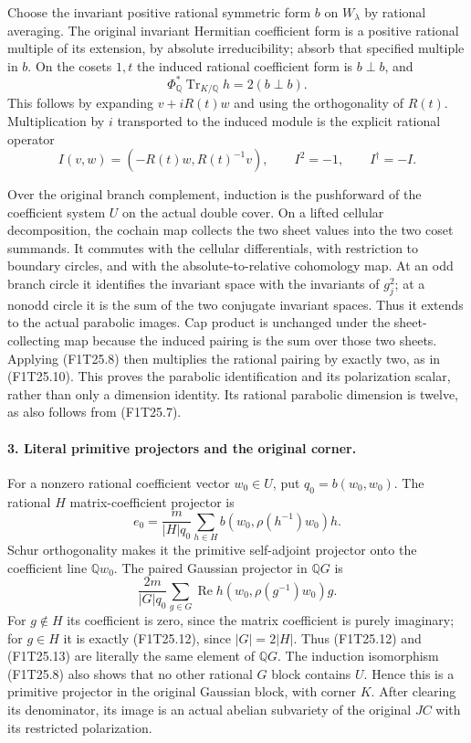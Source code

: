 Choose the invariant positive rational symmetric form $b$
on $W_\lambda$ by rational averaging. The original invariant
Hermitian coefficient form is a positive rational multiple
of its extension, by absolute irreducibility; absorb that
specified multiple in $b$. On the cosets $1,t$ the induced
rational coefficient form is $b\perp b$, and
\[
 \Phi_{\mathbb Q}^*\operatorname{Tr}_{K/\mathbb Q}h
                         =2(b\perp b).
 \tag{F1T25.10}
\]
This follows by expanding $v+iR(t)w$ and using the
orthogonality of $R(t)$. Multiplication by $i$ transported
to the induced module is the explicit rational operator
\[
                I(v,w)=(-R(t)w,R(t)^{-1}v),
          \qquad I^2=-1,\qquad I^\dagger=-I.
 \tag{F1T25.11}
\]

Over the original branch complement, induction is the
pushforward of the coefficient system $U$ on the actual
double cover. On a lifted cellular decomposition, the
cochain map collects the two sheet values into the two
coset summands. It commutes with the cellular differentials,
with restriction to boundary circles, and with the
absolute-to-relative cohomology map. At an odd branch
circle it identifies the invariant space with the
invariants of $g_j^2$; at a nonodd circle it is the sum
of the two conjugate invariant spaces. Thus it extends
to the actual parabolic images. Cap product is unchanged
under the sheet-collecting map because the induced pairing
is the sum over those two sheets. Applying (F1T25.8) then
multiplies the rational pairing by exactly two, as in
(F1T25.10). This proves the parabolic identification and
its polarization scalar, rather than only a dimension
identity. Its rational parabolic dimension is twelve,
as also follows from (F1T25.7).

\paragraph{3. Literal primitive projectors and the original corner.}
For a nonzero rational coefficient vector $w_0\in U$,
put $q_0=b(w_0,w_0)$. The rational $H$ matrix-coefficient
projector is
\[
 e_0=\frac{m}{|H|q_0}
       \sum_{h\in H}b(w_0,\rho(h^{-1})w_0)h.
 \tag{F1T25.12}
\]
Schur orthogonality makes it the primitive self-adjoint
projector onto the coefficient line $\mathbb Qw_0$.
The paired Gaussian projector in $\mathbb QG$ is
\[
 \frac{2m}{|G|q_0}\sum_{g\in G}
       \operatorname{Re}h(w_0,\rho(g^{-1})w_0)g.
 \tag{F1T25.13}
\]
For $g\notin H$ its coefficient is zero, since the
matrix coefficient is purely imaginary; for $g\in H$
it is exactly (F1T25.12), since $|G|=2|H|$.
Thus (F1T25.12) and (F1T25.13) are literally the same
element of $\mathbb QG$. The induction isomorphism
(F1T25.8) also shows that no other rational $G$ block
contains $U$. Hence this is a primitive projector in
the original Gaussian block, with corner $K$.
After clearing its denominator, its image is an actual
abelian subvariety of the original $JC$ with its
restricted polarization.

